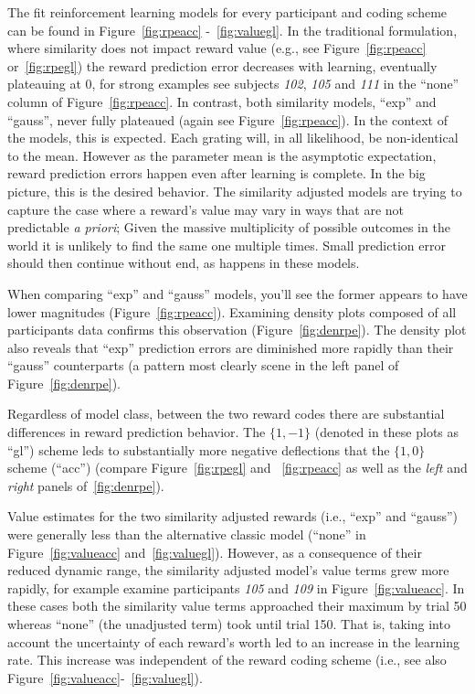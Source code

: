 The fit reinforcement learning models for every participant and coding scheme can be found in Figure~\ref{fig:rpeacc} -~\ref{fig:valuegl}.  In the traditional formulation, where similarity does not impact reward value (e.g., see Figure~\ref{fig:rpeacc} or~\ref{fig:rpegl}) the reward prediction error decreases with learning, eventually plateauing at 0, for strong examples see subjects \emph{102}, \emph{105} and \emph{111} in the ``none'' column of Figure~\ref{fig:rpeacc}.  In contrast, both similarity models, ``exp'' and ``gauss'', never fully plateaued (again see Figure~\ref{fig:rpeacc}).  In the context of the models, this is expected.  Each grating will, in all likelihood, be non-identical to the mean. However as the parameter mean is the asymptotic expectation, reward prediction errors happen even after learning is complete.  In the big picture, this is the desired behavior.  The similarity adjusted models are trying to capture the case where a reward's value may vary in ways that are not predictable \emph{a priori}; Given the massive multiplicity of possible outcomes in the world it is unlikely to find the same one multiple times.  Small prediction error should then continue without end, as happens in these models.

When comparing ``exp'' and ``gauss'' models, you'll see the former appears to have lower magnitudes (Figure~\ref{fig:rpeacc}).  Examining density plots composed of all participants data confirms this observation (Figure~\ref{fig:denrpe}).  The density plot also reveals that ``exp'' prediction errors are diminished more rapidly than their ``gauss'' counterparts (a pattern most clearly scene in the left panel of Figure~\ref{fig:denrpe}).  

Regardless of model class, between the two reward codes there are substantial differences in reward prediction behavior.  The $\{1,-1\}$ (denoted in these plots as ``gl'') scheme leds to substantially more negative deflections that the $\{1,0\}$ scheme (``acc'') (compare Figure~\ref{fig:rpegl} and ~\ref{fig:rpeacc} as well as the \emph{left} and \emph{right} panels of~\ref{fig:denrpe}).   

Value estimates for the two similarity adjusted rewards (i.e., ``exp'' and ``gauss'') were generally less than the alternative classic model (``none'' in Figure~\ref{fig:valueacc} and~\ref{fig:valuegl}).  However, as a consequence of their reduced dynamic range, the similarity adjusted model's value terms grew more rapidly, for example examine participants \emph{105} and \emph{109} in Figure~\ref{fig:valueacc}.  In these cases both the similarity value terms approached their maximum by trial 50 whereas ``none'' (the unadjusted term) took until trial 150.  That is, taking into account the uncertainty of each reward's worth led to an increase in the learning rate.  This increase was independent of the reward coding scheme (i.e., see also Figure~\ref{fig:valueacc}-~\ref{fig:valuegl}).  

